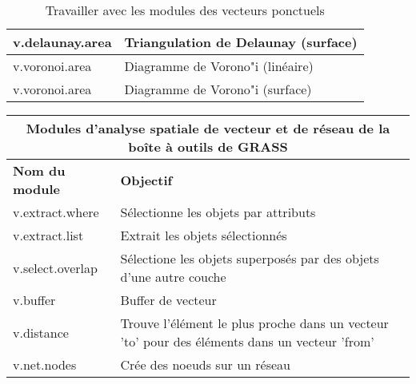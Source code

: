 \begin{table}[H]
\begin{tabular}{|p{4cm}|p{10cm}|}
  \hline v.delaunay.area & Triangulation de Delaunay (surface) \\
  \hline v.voronoi.area & Diagramme de Vorono"i (linéaire) \\
  \hline v.voronoi.area & Diagramme de Vorono"i (surface) \\
\hline
\end{tabular}
\caption{Travailler avec les modules des vecteurs ponctuels}
\end{table}

\begin{table}[H]
\centering
 \begin{tabular}{|p{4cm}|p{10cm}|}
  \hline \multicolumn{2}{|c|}{\textbf{Modules d'analyse spatiale de vecteur et de réseau de la boîte à outils de GRASS}} \\
  \hline \textbf{Nom du module} & \textbf{Objectif} \\
  \hline v.extract.where & Sélectionne les objets par attributs\\
  \hline v.extract.list & Extrait les objets sélectionnés\\
  \hline v.select.overlap & Sélectione les objets superposés par des objets d'une autre couche\\
  \hline v.buffer & Buffer de vecteur\\
  \hline v.distance & Trouve l'élément le plus proche dans un vecteur 'to' pour des éléments dans un vecteur 'from'\\
  \hline v.net.nodes & Crée des noeuds sur un réseau\\

\end{tabular}
\end{table}

